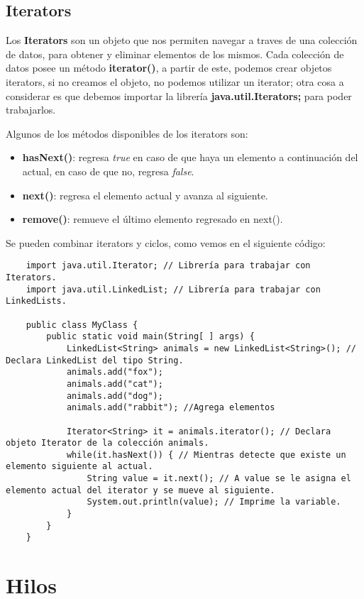 \subsection{Iterators}

Los \textbf{Iterators} son un objeto que nos permiten navegar a traves de una colección de datos, para obtener y eliminar elementos de los mismos. Cada colección de datos posee un método \textbf{iterator()}, a partir de este, podemos crear objetos iterators, si no creamos el objeto, no podemos utilizar un iterator; otra cosa a considerar es que debemos importar la librería \textbf{java.util.Iterators;} para poder trabajarlos.

Algunos de los métodos disponibles de los iterators son:
\begin{itemize}
    \item \textbf{hasNext()}: regresa \textit{true} en caso de que haya un elemento a continuación del actual, en caso de que no, regresa \textit{false}.
    \item \textbf{next()}: regresa el elemento actual y avanza al siguiente.
    \item \textbf{remove()}: remueve el último elemento regresado en next().
\end{itemize}

Se pueden combinar iterators y ciclos, como vemos en el siguiente código:
\begin{lstlisting}
    import java.util.Iterator; // Librería para trabajar con Iterators.
    import java.util.LinkedList; // Librería para trabajar con LinkedLists.

    public class MyClass {
        public static void main(String[ ] args) {
            LinkedList<String> animals = new LinkedList<String>(); // Declara LinkedList del tipo String.
            animals.add("fox");
            animals.add("cat");
            animals.add("dog");
            animals.add("rabbit"); //Agrega elementos
        
            Iterator<String> it = animals.iterator(); // Declara objeto Iterator de la colección animals.
            while(it.hasNext()) { // Mientras detecte que existe un elemento siguiente al actual.
                String value = it.next(); // A value se le asigna el elemento actual del iterator y se mueve al siguiente.
                System.out.println(value); // Imprime la variable.
            }
        }
    }
\end{lstlisting}



\section{Hilos}

